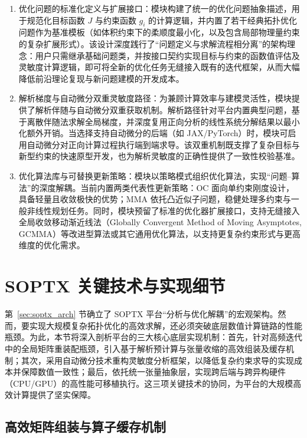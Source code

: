 \begin{enumerate}
	\item 优化问题的标准化定义与扩展接口：模块构建了统一的优化问题抽象描述，用于规范化目标函数 $J$ 与约束函数 $g_i$ 的计算逻辑，并内置了若干经典拓扑优化问题作为基准模板（如体积约束下的柔顺度最小化，以及包含局部物理量约束的复杂扩展形式）。该设计深度践行了“问题定义与求解流程相分离”的架构理念：用户只需继承基础问题类，并按接口契约实现目标与约束的函数值评估及灵敏度计算逻辑，即可将全新的优化任务无缝接入既有的迭代框架，从而大幅降低前沿理论复现与新问题建模的开发成本。
	
	\item 解析梯度与自动微分双重灵敏度路径：为兼顾计算效率与建模灵活性，模块提供了解析伴随与自动微分双重获取机制。解析路径针对平台内置典型问题，基于离散伴随法求解全局梯度，并深度复用正向分析的线性系统分解结果以最小化额外开销。当选择支持自动微分的后端（如 JAX/PyTorch）时，模块可启用自动微分对正向计算过程执行端到端求导。该双重机制既支撑了复杂目标与新型约束的快速原型开发，也为解析灵敏度的正确性提供了一致性校验基准。
	
	\item 优化算法库与可替换更新策略：模块以策略模式组织优化算法，实现“问题--算法”的深度解耦。当前内置两类代表性更新策略：OC 面向单约束刚度设计，具备轻量且收敛极快的优势；MMA 依托凸近似子问题，稳健处理多约束与一般非线性规划任务。同时，模块预留了标准的优化器扩展接口，支持无缝接入全局收敛移动渐近线法（Globally Convergent Method of Moving Asymptotes, GCMMA）等改进型算法或其它通用优化算法，以支持更复杂约束形式与更高维度的优化需求。
\end{enumerate}


\section{SOPTX 关键技术与实现细节}
\label{sec:soptx_tech}

第~\ref{sec:soptx_arch} 节确立了 SOPTX 平台“分析与优化解耦”的宏观架构。然而，要实现大规模复杂拓扑优化的高效求解，还必须突破底层数值计算链路的性能瓶颈。为此，本节将深入剖析平台的三大核心底层实现机制：首先，针对高频迭代中的全局矩阵重装配瓶颈，引入基于解析预计算与张量收缩的高效组装及缓存机制；其次，采用自动微分技术重构灵敏度分析框架，以降低复杂约束求导的实现成本并保障数值一致性；最后，依托统一张量抽象层，实现跨后端与跨异构硬件（CPU/GPU）的高性能可移植执行。这三项关键技术的协同，为平台的大规模高效计算提供了坚实保障。


\subsection{高效矩阵组装与算子缓存机制}
\label{subsec:fast_assmbly}

